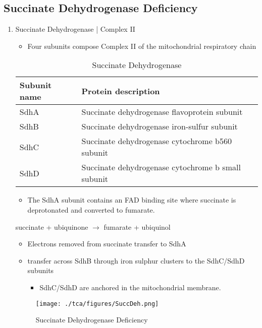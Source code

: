\documentclass{scrartcl}
\begin{document}
\subsection{Succinate Dehydrogenase Deficiency}
\label{sec:org273cde7}
\begin{enumerate}
\item Succinate Dehydrogenase | Complex II
\label{sec:org4243c9c}
\begin{itemize}
\item Four subunits compose Complex II of the mitochondrial respiratory chain
\end{itemize}

\begin{table}[htbp]
\caption{\label{tab:org906cb9e}
Succinate Dehydrogenase}
\centering
\begin{tabular}{ll}
Subunit name & Protein description\\
\hline
SdhA & Succinate dehydrogenase flavoprotein subunit\\
SdhB & Succinate dehydrogenase iron-sulfur subunit\\
SdhC & Succinate dehydrogenase cytochrome b560 subunit\\
SdhD & Succinate dehydrogenase cytochrome b small subunit\\
\end{tabular}
\end{table}

\begin{itemize}
\item The SdhA subunit contains an FAD binding site where succinate
is deprotonated and converted to fumarate.
\end{itemize}

succinate + ubiquinone \(\to\) fumarate + ubiquinol

\begin{itemize}
\item Electrons removed from succinate transfer to SdhA
\item transfer across SdhB through iron sulphur clusters to the SdhC/SdhD subunits
\begin{itemize}
\item SdhC/SdhD are anchored in the mitochondrial membrane.
\end{itemize}
\end{itemize}

\begin{figure}[htbp]
\centering
\texttt{[image: ./tca/figures/SuccDeh.png]}
\caption{\label{fig:orga1023d5}
Succinate Dehydrogenase Deficiency}
\end{figure}


\end{enumerate}
\end{document}
